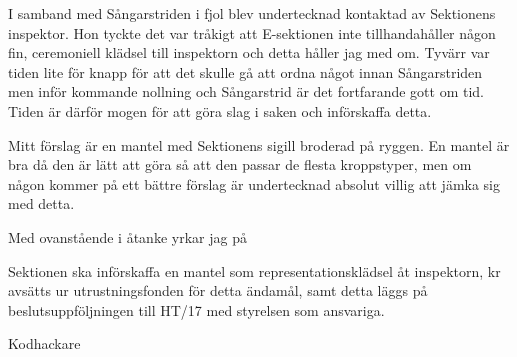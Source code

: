 \documentclass[../_main/handlingar.tex]{subfiles}
\begin{document}

I samband med Sångarstriden i fjol blev undertecknad kontaktad av Sektionens inspektor. Hon tyckte det var tråkigt att E-sektionen inte tillhandahåller någon fin, ceremoniell klädsel till inspektorn och detta håller jag med om. Tyvärr var tiden lite för knapp för att det skulle gå att ordna något innan Sångarstriden men inför kommande nollning och Sångarstrid är det fortfarande gott om tid. Tiden är därför mogen för att göra slag i saken och införskaffa detta.

Mitt förslag är en mantel med Sektionens sigill broderad på ryggen. En mantel är bra då den är lätt att göra så att den passar de flesta kroppstyper, men om någon kommer på ett bättre förslag är undertecknad absolut villig att jämka sig med detta.

Med ovanstående i åtanke yrkar jag på
\begin{attsatser}
    \att Sektionen ska införskaffa en mantel som representationsklädsel åt inspektorn,
     kr avsätts ur utrustningsfonden för detta ändamål, samt
    \att detta läggs på beslutsuppföljningen till HT/17 med styrelsen som ansvariga.
\end{attsatser}

\begin{signatures}{1}
    \mvh
    \signature{Fredrik Peterson}{Kodhackare}
\end{signatures}
\end{document}
